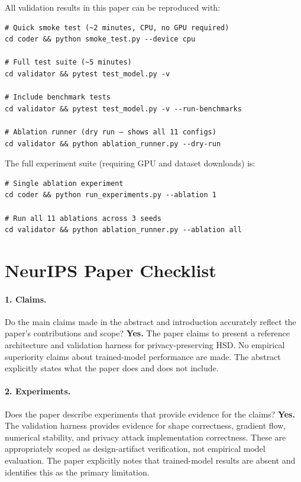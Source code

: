 \documentclass{article}
\begin{document}
All validation results in this paper can be reproduced with:

\begin{verbatim}
# Quick smoke test (~2 minutes, CPU, no GPU required)
cd coder && python smoke_test.py --device cpu

# Full test suite (~5 minutes)
cd validator && pytest test_model.py -v

# Include benchmark tests
cd validator && pytest test_model.py -v --run-benchmarks

# Ablation runner (dry run — shows all 11 configs)
cd validator && python ablation_runner.py --dry-run
\end{verbatim}

\noindent
The full experiment suite (requiring GPU and dataset downloads) is:

\begin{verbatim}
# Single ablation experiment
cd coder && python run_experiments.py --ablation 1

# Run all 11 ablations across 3 seeds
cd validator && python ablation_runner.py --ablation all
\end{verbatim}


\newpage
\section*{NeurIPS Paper Checklist}

\paragraph{1. Claims.}
Do the main claims made in the abstract and introduction accurately reflect
the paper's contributions and scope?
\textbf{Yes.}
The paper claims to present a reference architecture and validation harness
for privacy-preserving HSD. No empirical superiority claims about
trained-model performance are made. The abstract explicitly states what
the paper does and does not include.

\paragraph{2. Experiments.}
Does the paper describe experiments that provide evidence for the claims?
\textbf{Yes.}
The validation harness provides evidence for shape correctness, gradient
flow, numerical stability, and privacy attack implementation correctness.
These are appropriately scoped as design-artifact verification, not
empirical model evaluation. The paper explicitly notes that trained-model
results are absent and identifies this as the primary limitation.
\end{document}
